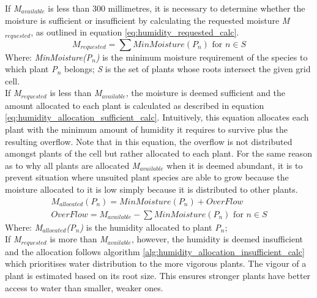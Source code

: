 If \textit{M$_{available}$} is less than 300 millimetres, it is necessary to determine whether the moisture is sufficient or insufficient by calculating the requested moisture \textit{M$_{requested}$}, as outlined in equation \ref{eq:humidity_requested_calc}. \\

\begin{equation}
M_{requested} = \sum MinMoisture(P_{n}) \text{ for } n \in S
\label{eq:humidity_requested_calc}
\end{equation}
Where: \textit{MinMoisture(P$_{n}$)} is the minimum moisture requirement of the species to which plant \textit{P$_{n}$} belongs; \textit{S} is the set of plants whose roots intersect the given grid cell.\\

If \textit{M$_{requested}$} is less than \textit{M$_{available}$}, the moisture is deemed sufficient and the amount allocated to each plant is calculated as described in equation \ref{eq:humidity_allocation_sufficient_calc}. Intuitively, this equation allocates each plant with the minimum amount of humidity it requires to survive plus the resulting overflow. Note that in this equation, the overflow is not distributed amongst plants of the cell but rather allocated to each plant. For the same reason as to why all plants are allocated \textit{M$_{available}$} when it is deemed abundant, it is to prevent situation where unsuited plant species are able to grow because the moisture allocated to it is low simply because it is distributed to other plants.\\

\begin{equation}
\begin{split}
M_{allocated}(P_{n}) = MinMoisture(P_{n}) + OverFlow \\
OverFlow = M_{available} - \sum MinMoisture(P_{n}) \text{ for } n \in S
\end{split}
\label{eq:humidity_allocation_sufficient_calc}
\end{equation}
Where: \textit{M$_{allocated}$(P$_{n}$)} is the humidity allocated to plant \textit{P$_{n}$};\\

If \textit{M$_{requested}$} is more than \textit{M$_{available}$}, however, the humidity is deemed insufficient and the allocation follows algorithm \ref{alg:humidity_allocation_insufficient_calc} which prioritises water distribution to the more vigorous plants. The vigour of a plant is estimated based on its root size. This ensures stronger plants have better access to water than smaller, weaker ones.\\

